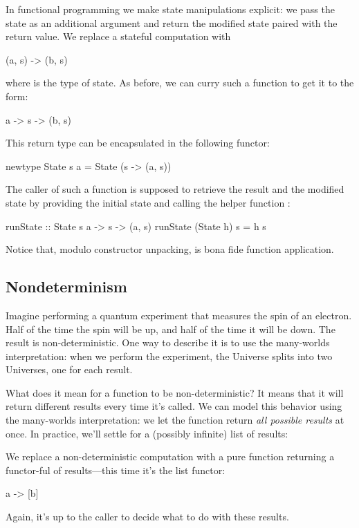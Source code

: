 \documentclass[DaoFP]{subfiles}
\begin{document}
In functional programming we make state manipulations explicit: we pass the state as an additional argument and return the modified state paired with the return value. We replace a stateful computation  with
\begin{haskell}
(a, s) -> (b, s)
\end{haskell}
where  is the type of state. As before, we can curry such a function to get it to the form:
\begin{haskell}
a -> s -> (b, s)
\end{haskell}
This return type can be encapsulated in the following functor:
\begin{haskell}
newtype State s a = State (s -> (a, s))
\end{haskell}
The caller of such a function is supposed to retrieve the result and the modified state by providing the initial state and calling the helper function :
\begin{haskell}
runState :: State s a -> s -> (a, s)
runState (State h) s = h s
\end{haskell}
Notice that, modulo constructor unpacking,  is bona fide function application. 

\subsection{Nondeterminism}

Imagine performing a quantum experiment that measures the spin of an electron. Half of the time the spin will be up, and half of the time it will be down. The result is non-deterministic. One way to describe it is to use the many-worlds interpretation: when we perform the experiment, the Universe splits into two Universes, one for each result.  

What does it mean for a function to be non-deterministic? It means that it will return different results every time it's called. We can model this behavior using the many-worlds interpretation: we let the function return \emph{all possible results} at once. In practice, we'll settle for a (possibly infinite) list of results:

We replace a non-deterministic computation  with a pure function returning a functor-ful of results---this time it's the list functor:
\begin{haskell}
a -> [b]
\end{haskell}
Again, it's up to the caller to decide what to do with these results.
\end{document}
